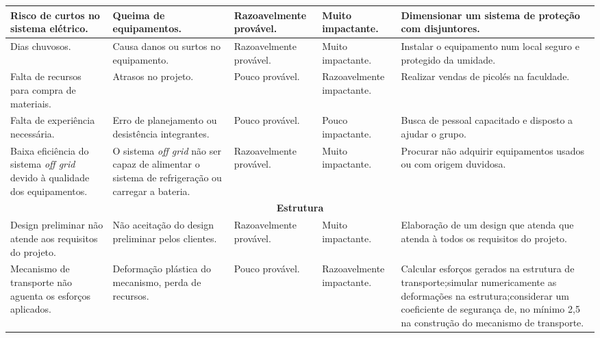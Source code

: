 \begin{longtable}{|m{2.8cm}|m{4cm}|m{2.5cm}|m{2.2cm}|m{4cm}|}
Risco de curtos no sistema elétrico.                                                      & Queima de equipamentos.                             & Razoavelmente provável. & Muito impactante.        & Dimensionar um sistema de proteção com disjuntores.                                                                                                         \\ \hline
 Dias chuvosos.      & Causa danos ou surtos no equipamento.                    & Razoavelmente provável. & Muito impactante.         & Instalar o equipamento num local seguro e protegido da umidade.             \\ \hline
Falta de recursos para compra de materiais. & Atrasos no projeto.                         & Pouco provável.         & Razoavelmente impactante.         & Realizar vendas de picolés na faculdade.                                    \\ \hline
 Falta de experiência necessária.              & Erro de planejamento ou desistência integrantes.                              & Pouco provável.         & Pouco impactante.         & Busca de pessoal capacitado e disposto a ajudar o grupo.                                                                                                            \\ \hline
Baixa eficiência do sistema \textit{off grid} devido à qualidade dos equipamentos.    & O sistema \textit{off grid} não ser capaz de alimentar o sistema de refrigeração ou carregar a bateria. & Razoavelmente provável. & Muito impactante.         &  Procurar não adquirir equipamentos usados ou com origem duvidosa.
\\ \hline
\multicolumn{5}{|c|}{\textbf{Estrutura}}\tabularnewline
\hline
Design preliminar não atende aos requisitos do projeto.                                        & Não aceitação do design preliminar pelos clientes.                      & Razoavelmente provável. & Muito impactante.         & Elaboração de um design que atenda que atenda à todos os requisitos do projeto.                                                                                                                                      \\ \hline
Mecanismo de transporte não aguenta os esforços aplicados.                                  & Deformação plástica do mecanismo, perda de recursos.             & Pouco provável.         & Razoavelmente impactante. & Calcular esforços gerados na estrutura de transporte;simular numericamente as deformações na estrutura;considerar um coeficiente de segurança de, no mínimo 2,5 na construção do mecanismo de transporte. \\ \hline

\end{longtable}
